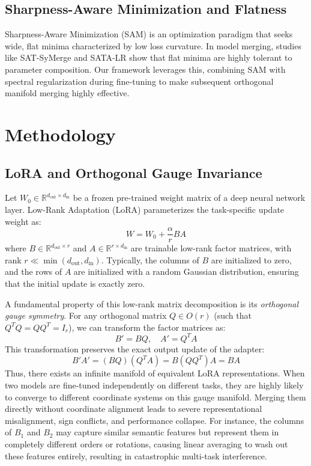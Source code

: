 \documentclass{article}
\theoremstyle{plain}
\theoremstyle{definition}
\theoremstyle{remark}
\begin{document}
\subsection{Sharpness-Aware Minimization and Flatness}
Sharpness-Aware Minimization (SAM) \cite{foret2020sharpness} is an optimization paradigm that seeks wide, flat minima characterized by low loss curvature. In model merging, studies like SAT-SyMerge \cite{sat-symerge} and SATA-LR \cite{sata-lr} show that flat minima are highly tolerant to parameter composition. Our framework leverages this, combining SAM with spectral regularization during fine-tuning to make subsequent orthogonal manifold merging highly effective.
\section{Methodology}
\label{sec:methodology}

\subsection{LoRA and Orthogonal Gauge Invariance}
Let $W_0 \in \mathbb{R}^{d_{\text{out}} \times d_{\text{in}}}$ be a frozen pre-trained weight matrix of a deep neural network layer. Low-Rank Adaptation (LoRA) \cite{hu2021lora} parameterizes the task-specific update weight as:
\begin{equation}
W = W_0 + \frac{\alpha}{r} B A
\end{equation}
where $B \in \mathbb{R}^{d_{\text{out}} \times r}$ and $A \in \mathbb{R}^{r \times d_{\text{in}}}$ are trainable low-rank factor matrices, with rank $r \ll \min(d_{\text{out}}, d_{\text{in}})$. Typically, the columns of $B$ are initialized to zero, and the rows of $A$ are initialized with a random Gaussian distribution, ensuring that the initial update is exactly zero.

A fundamental property of this low-rank matrix decomposition is its \textit{orthogonal gauge symmetry}. For any orthogonal matrix $Q \in O(r)$ (such that $Q^T Q = Q Q^T = I_r$), we can transform the factor matrices as:
\begin{equation}
B' = B Q, \quad A' = Q^T A
\end{equation}
This transformation preserves the exact output update of the adapter:
\begin{equation}
B' A' = (B Q)(Q^T A) = B (Q Q^T) A = B A
\end{equation}
Thus, there exists an infinite manifold of equivalent LoRA representations. When two models are fine-tuned independently on different tasks, they are highly likely to converge to different coordinate systems on this gauge manifold. Merging them directly without coordinate alignment leads to severe representational misalignment, sign conflicts, and performance collapse. For instance, the columns of $B_1$ and $B_2$ may capture similar semantic features but represent them in completely different orders or rotations, causing linear averaging to wash out these features entirely, resulting in catastrophic multi-task interference.
\end{document}
